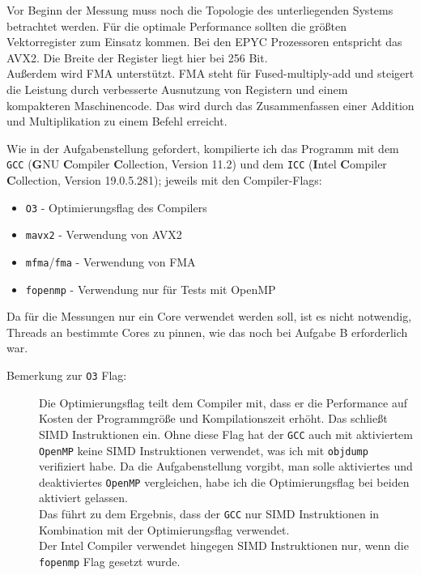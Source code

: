 \documentclass[german,plainarticle,hyperref,utf8]{zihpub}
\begin{document}
	Vor Beginn der Messung muss noch die Topologie des unterliegenden Systems betrachtet werden. Für die optimale Performance sollten die größten Vektorregister zum Einsatz kommen. Bei den EPYC Prozessoren entspricht das AVX2. Die Breite der Register liegt hier bei 256 Bit.\\
	Außerdem wird FMA unterstützt. FMA steht für Fused-multiply-add und steigert die Leistung durch verbesserte Ausnutzung von Registern und einem kompakteren Maschinencode. Das wird durch das Zusammenfassen einer Addition und Multiplikation zu einem Befehl erreicht.
	
	Wie in der Aufgabenstellung gefordert, kompilierte ich das Programm mit dem \texttt{GCC} (\textbf{G}NU \textbf{C}ompiler \textbf{C}ollection, Version 11.2) und dem \texttt{ICC} (\textbf{I}ntel \textbf{C}ompiler \textbf{C}ollection, Version 19.0.5.281); jeweils mit den Compiler-Flags:
	\begin{itemize}
		\item \texttt{O3} - Optimierungsflag des Compilers
		\item \texttt{mavx2} - Verwendung von AVX2
		\item \texttt{mfma}/\texttt{fma} - Verwendung von FMA
		\item \texttt{fopenmp} - Verwendung nur für Tests mit OpenMP
	\end{itemize}
	
	Da für die Messungen nur ein Core verwendet werden soll, ist es nicht notwendig, Threads an bestimmte Cores zu pinnen, wie das noch bei Aufgabe B erforderlich war.\\
	
	\begin{description}
		\item[Bemerkung zur \texttt{O3} Flag:] Die Optimierungsflag teilt dem Compiler mit, dass er die Performance auf Kosten der Programmgröße und Kompilationszeit erhöht. Das schließt SIMD Instruktionen ein. Ohne diese Flag hat der \texttt{GCC} auch mit aktiviertem \texttt{OpenMP} keine SIMD Instruktionen verwendet, was ich mit \texttt{objdump} verifiziert habe. Da die Aufgabenstellung vorgibt, man solle aktiviertes und deaktiviertes \texttt{OpenMP} vergleichen, habe ich die Optimierungsflag bei beiden aktiviert gelassen.\\
		Das führt zu dem Ergebnis, dass der \texttt{GCC} nur SIMD Instruktionen in Kombination mit der Optimierungsflag verwendet.\\
		Der Intel Compiler verwendet hingegen SIMD Instruktionen nur, wenn die \texttt{fopenmp} Flag gesetzt wurde.
	\end{description}
	
\end{document}
